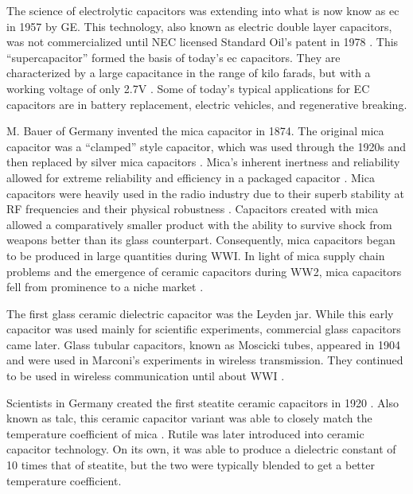 The science of electrolytic capacitors was extending into what is now know as \gls{ec} in 1957 by GE. This technology, also known as electric double layer capacitors, was not commercialized until NEC licensed Standard Oil's patent in 1978 \cite{electrochem_intro}. This ``supercapacitor'' formed the basis of today's \gls{ec} capacitors. They are characterized by a large capacitance in the range of kilo farads, but with a working voltage of only 2.7V \cite{electrochem_intro}. Some of today's typical applications for EC capacitors are in battery replacement, electric vehicles, and regenerative breaking.

\nocite{hh}
\nocite{capGuide_mica}
M. Bauer of Germany invented the mica capacitor in 1874. The original mica capacitor was a ``clamped'' style capacitor, which was used through the 1920s \cite{wiki_mica} and then replaced by silver mica capacitors \cite{learn_caps}.
Mica's inherent inertness and reliability allowed for extreme reliability and efficiency in a packaged capacitor \cite{tedds_mica}. Mica capacitors were heavily used in the radio industry due to their superb stability at RF frequencies and their physical robustness \cite{radio_mica}.
Capacitors created with mica allowed a comparatively smaller product \cite[f.~37-41]{dumInv} with the ability to survive shock from weapons better than its glass counterpart. Consequently, mica capacitors began to be produced in large quantities during WWI.
In light of mica supply chain problems and the emergence of ceramic capacitors during WW2, mica capacitors fell from prominence to a niche market \cite[Ch 3, Sec II]{cerMaterials}.

The first glass ceramic dielectric capacitor was the Leyden jar. While this early capacitor was used mainly for scientific experiments, commercial glass capacitors came later. 
Glass tubular capacitors, known as Moscicki tubes, appeared in 1904 and were used in Marconi's experiments in wireless transmission. They continued to be used in wireless communication until about WWI \cite[p.~102]{dumInv}.

Scientists in Germany created the first steatite ceramic capacitors in 1920 \cite[Ch 3 Sec II]{cerMaterials}\cite{cerDie}. Also known as talc, this ceramic capacitor variant was able to closely match the temperature coefficient of mica \cite{steatite_hf}. Rutile was later introduced into ceramic capacitor technology. On its own, it was able to produce a dielectric constant of 10 times that of steatite, but the two were typically blended to get a better temperature coefficient. 

